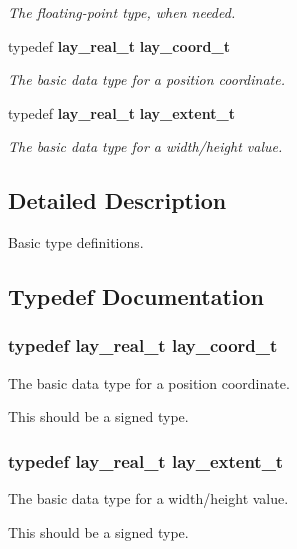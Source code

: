 \begin{CompactItemize}
\begin{CompactList}\small\item\em The floating-point type, when needed. \item\end{CompactList}\item 
typedef {\bf lay\_\-real\_\-t} {\bf lay\_\-coord\_\-t}
\begin{CompactList}\small\item\em The basic data type for a position coordinate. \item\end{CompactList}\item 
typedef {\bf lay\_\-real\_\-t} {\bf lay\_\-extent\_\-t}
\begin{CompactList}\small\item\em The basic data type for a width/height value. \item\end{CompactList}\end{CompactItemize}


\subsection{Detailed Description}
Basic type definitions. 



\subsection{Typedef Documentation}
\subsubsection{\setlength{\rightskip}{0pt plus 5cm}typedef {\bf lay\_\-real\_\-t} {\bf lay\_\-coord\_\-t}}\label{types_8h_a6}


The basic data type for a position coordinate. 

This should be a signed type. 
\subsubsection{\setlength{\rightskip}{0pt plus 5cm}typedef {\bf lay\_\-real\_\-t} {\bf lay\_\-extent\_\-t}}\label{types_8h_a7}


The basic data type for a width/height value. 

This should be a signed type. 